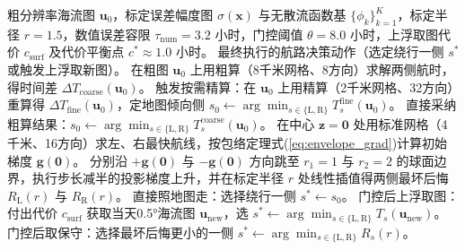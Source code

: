 \begin{algorithm}[htbp]
\caption{基于合理反例检验的自主水下航行器航路门控决策算法}
\label{alg:counterexample_gate}
\begin{algorithmic}[1]
\Require 粗分辨率海流图 $\boldsymbol{u}_0$，标定误差幅度图 $\sigma(\boldsymbol{x})$ 与无散流函数基 $\{\phi_k\}_{k=1}^{K}$，标定半径 $r=1.5$，数值误差容限 $\tau_{\text{num}}=3.2$ 小时，门控阈值 $\theta=8.0$ 小时，上浮取图代价 $c_{\text{surf}}$ 及代价平衡点 $c^* \approx 1.0$ 小时。
\Ensure 最终执行的航路决策动作（选定绕行一侧 $s^*$ 或触发上浮取新图）。
\State 在粗图 $\boldsymbol{u}_0$ 上用粗算（8千米网格、8方向）求解两侧航时，得时间差 $\Delta T_{\text{coarse}}(\boldsymbol{u}_0)$。
    \State 触发按需精算：在 $\boldsymbol{u}_0$ 上用精算（2千米网格、32方向）重算得 $\Delta T_{\text{fine}}(\boldsymbol{u}_0)$，定地图倾向侧 $s_0 \gets \arg\min_{s \in \{\text{L},\text{R}\}} T_s^{\text{fine}}(\boldsymbol{u}_0)$。
\Else
    \State 直接采纳粗算结果：$s_0 \gets \arg\min_{s \in \{\text{L},\text{R}\}} T_s^{\text{coarse}}(\boldsymbol{u}_0)$。
\EndIf
\State 在中心 $\boldsymbol{z}=\boldsymbol{0}$ 处用标准网格（4千米、16方向）求左、右最快航线，按包络定理式(\ref{eq:envelope_grad})计算初始梯度 $\boldsymbol{g}(\boldsymbol{0})$。
\State 分别沿 $+\boldsymbol{g}(\boldsymbol{0})$ 与 $-\boldsymbol{g}(\boldsymbol{0})$ 方向跳至 $r_1=1$ 与 $r_2=2$ 的球面边界，执行步长减半的投影梯度上升，并在标定半径 $r$ 处线性插值得两侧最坏后悔 $R_{\text{L}}(r)$ 与 $R_{\text{R}}(r)$。
    \State \Return 直接照地图走：选择绕行一侧 $s^* \gets s_0$。
\Else
        \State \Return 门控后上浮取图：付出代价 $c_{\text{surf}}$ 获取当天0.5°海流图 $\boldsymbol{u}_{\text{new}}$，选 $s^* \gets \arg\min_{s \in \{\text{L},\text{R}\}} T_s(\boldsymbol{u}_{\text{new}})$。
    \Else
        \State \Return 门控后取保守：选择最坏后悔更小的一侧 $s^* \gets \arg\min_{s \in \{\text{L},\text{R}\}} R_s(r)$。
    \EndIf
\EndIf
\end{algorithmic}
\end{algorithm}
